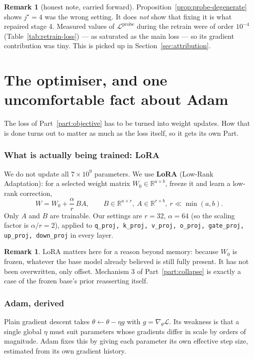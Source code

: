 \documentclass[11pt]{article}
\theoremstyle{definition}
\newtheorem{remark}[theorem]{Remark}
\begin{document}
\begin{remark}[honest note, carried forward]
Proposition~\ref{prop:probe-degenerate} shows $j^\star = 4$ was the wrong setting. It does \emph{not} show that fixing it is what repaired stage 4. Measured values of $\mathcal{L}^{\mathrm{probe}}$ during the retrain were of order $10^{-4}$ (Table~\ref{tab:retrain-loss}) --- as saturated as the main loss --- so its gradient contribution was tiny. This is picked up in Section~\ref{sec:attribution}.
\end{remark}

\newpage
\part{The optimiser, and one uncomfortable fact about Adam}
\label{part:optimiser}

The loss of Part~\ref{part:objective} has to be turned into weight updates. How that is done turns out to matter as much as the loss itself, so it gets its own Part.

\section{What is actually being trained: LoRA}

We do not update all $7\times10^{9}$ parameters. We use \textbf{LoRA} (Low-Rank Adaptation): for a selected weight matrix $W_0 \in \mathbb{R}^{a\times b}$, freeze it and learn a low-rank correction,
\[
W = W_0 + \frac{\alpha}{r}\,BA,
\qquad
B \in \mathbb{R}^{a\times r},\ A\in\mathbb{R}^{r\times b},\ r \ll \min(a,b).
\tag{8.1}
\]
Only $A$ and $B$ are trainable. Our settings are $r=32$, $\alpha=64$ (so the scaling factor is $\alpha/r = 2$), applied to \texttt{q\_proj, k\_proj, v\_proj, o\_proj, gate\_proj, up\_proj, down\_proj} in every layer.

\begin{remark}
LoRA matters here for a reason beyond memory: because $W_0$ is frozen, whatever the base model already believed is still fully present. It has not been overwritten, only offset. Mechanism 3 of Part~\ref{part:collapse} is exactly a case of the frozen base's prior reasserting itself.
\end{remark}

\section{Adam, derived}

Plain gradient descent takes $\theta \leftarrow \theta - \eta g$ with $g = \nabla_\theta \mathcal{L}$. Its weakness is that a single global $\eta$ must suit parameters whose gradients differ in scale by orders of magnitude. Adam fixes this by giving each parameter its own effective step size, estimated from its own gradient history.
\end{document}
